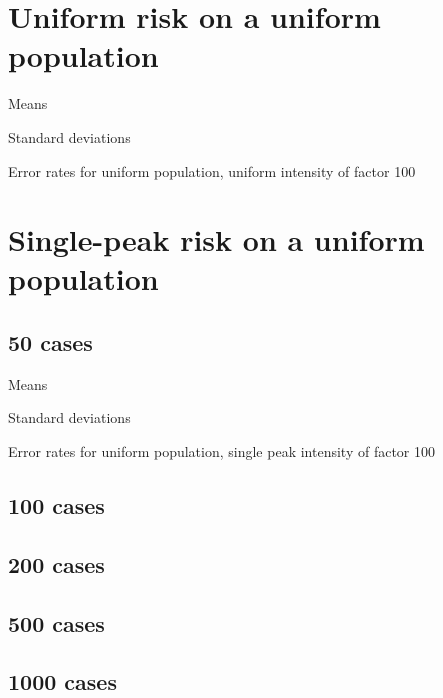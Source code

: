 
\section{Uniform risk on a uniform population}


\begin{table}[H]
\centering

    \begin{subtable}{0.9\textwidth}
    
    \caption{Means} 
    \end{subtable}

    \begin{subtable}{0.9\textwidth}
    
    \caption{Standard deviations} 
    \end{subtable}

\caption{Error rates for uniform population, uniform intensity of factor 100}
\label{tbl:mean_error_rates:unif_100_unif}
\end{table}


\section{Single-peak risk on a uniform population}

\subsection{50 cases}
\begin{table}[H]
\centering

    \begin{subtable}{0.9\textwidth}
    
    \caption{Means} 
    \end{subtable}

    \begin{subtable}{0.9\textwidth}
    
    \caption{Standard deviations} 
    \end{subtable}

\caption{Error rates for uniform population, single peak intensity of factor 100}
\label{tbl:mean_error_rates:unif_100_unif}
\end{table}

\subsection{100 cases}


\subsection{200 cases}


\subsection{500 cases}


\subsection{1000 cases}





